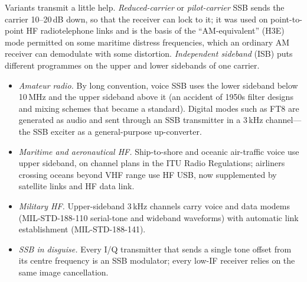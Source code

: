Variants transmit a little help. \emph{Reduced-carrier} or \emph{pilot-carrier} SSB sends the carrier
10--20\,dB down, so that the receiver can lock to it; it was used on point-to-point HF radiotelephone
links and is the basis of the ``AM-equivalent'' (H3E) mode permitted on some maritime distress
frequencies, which an ordinary AM receiver can demodulate with some distortion. \emph{Independent
sideband} (ISB) puts different programmes on the upper and lower sidebands of one carrier.

\begin{inpractice}[title=Who uses SSB today]
\begin{itemize}
\item \emph{Amateur radio.} By long convention, voice SSB uses the lower sideband below 10\,MHz and the
upper sideband above it (an accident of 1950s filter designs and mixing schemes that became a standard).
Digital modes such as FT8 are generated as audio and sent through an SSB transmitter in a 3\,kHz
channel---the SSB exciter as a general-purpose up-converter.
\item \emph{Maritime and aeronautical HF.} Ship-to-shore and oceanic air-traffic voice use upper
sideband, on channel plans in the ITU Radio Regulations; airliners crossing oceans beyond VHF range use
HF USB, now supplemented by satellite links and HF data link.
\item \emph{Military HF.} Upper-sideband 3\,kHz channels carry voice and data modems (MIL-STD-188-110
serial-tone and wideband waveforms) with automatic link establishment (MIL-STD-188-141).
\item \emph{SSB in disguise.} Every I/Q transmitter that sends a single tone offset from its centre
frequency is an SSB modulator; every low-IF receiver relies on the same image cancellation.
\end{itemize}
\end{inpractice}


